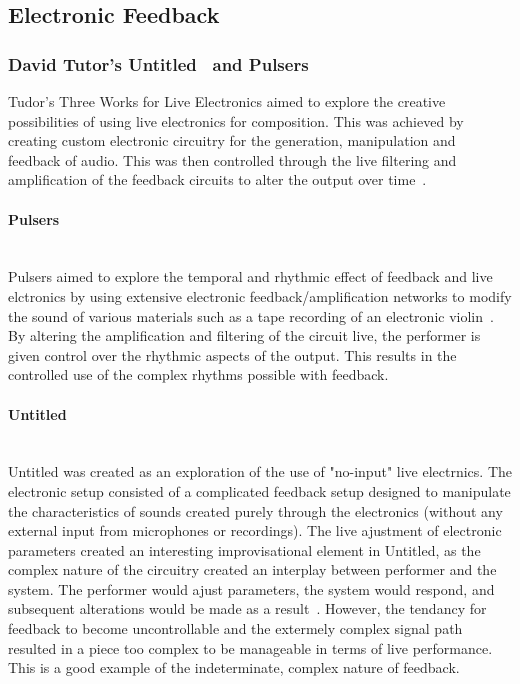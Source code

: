 \documentclass[titlepage]{scrartcl}
\begin{document}
    \subsection{Electronic Feedback}\label{ElecFeed}
    \subsubsection{David Tutor's Untitled~\citeyearpar{tudor1996twfle} and Pulsers~\citeyearpar{tudor1996twfle}}\label{tudor}
    Tudor's Three Works for Live Electronics aimed to explore the creative
    possibilities of using live electronics for composition. This was achieved
    by creating custom electronic circuitry for the generation, manipulation
    and feedback of audio. This was then controlled through the live filtering
    and amplification of the feedback circuits to alter the output over
    time~\parencite[p.187]{holmes2012eaem}.\\
    
    \paragraph{Pulsers}\mbox{}\\
    Pulsers aimed to explore the temporal and rhythmic effect of feedback and
    live elctronics by using extensive electronic feedback/amplification
    networks to modify the sound of various materials such as a tape recording
    of an electronic violin~\parencite{tudor1984twle}. By altering the amplification and filtering of the
    circuit live, the performer is given control over the rhythmic aspects of
    the output. This results in the controlled use of the complex rhythms
    possible with feedback.\\
    
    \paragraph{Untitled}\mbox{}\\
    Untitled was created as an exploration of the use of "no-input" live
    electrnics. The electronic setup consisted of a complicated feedback setup
    designed to manipulate the characteristics of sounds created purely through
    the electronics (without any external input from microphones or
    recordings).
    The live ajustment of electronic parameters created an interesting
    improvisational element in Untitled, as the complex nature of the
    circuitry created an interplay between performer and the system. The
    performer would ajust parameters, the system would respond, and subsequent
    alterations would be made as a result~\parencite{tudor1984twle}.
    However, the tendancy for feedback to become uncontrollable and the
    extermely complex signal path resulted in a piece too complex to be
    manageable in terms of live performance. This is a good example of the
    indeterminate, complex nature of
    feedback.~\parencite[p.83-85]{weisert2010ioi}
\end{document}
